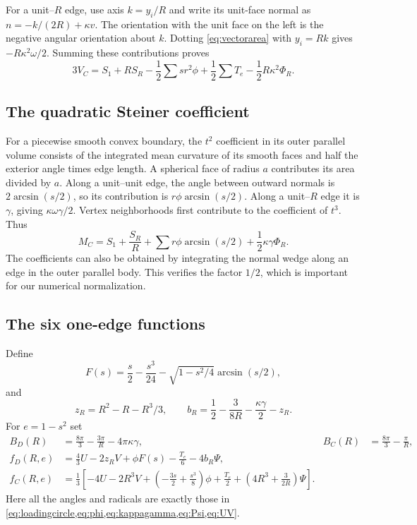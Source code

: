 \documentclass[11pt]{article}
\numberwithin{equation}{section}
\theoremstyle{definition}\newtheorem{definition}[theorem]{Definition}
\theoremstyle{remark}\newtheorem{remark}[theorem]{Remark}
\begin{document}
For a unit--$R$ edge, use axis $k=y_i/R$ and write its unit-face normal as
$n=-k/(2R)+\kappa v$. The orientation with the unit face on the left is the
negative angular orientation about $k$. Dotting \cref{eq:vectorarea} with
$y_i=Rk$ gives $-R\kappa^2\omega/2$. Summing these contributions proves
\begin{equation}\label{eq:VCledger}
 3V_C=S_1+RS_R-\frac12\sum sr^2\phi+\frac12\sum T_e
                         -\frac12R\kappa^2\Phi_R.
\end{equation}

\subsection{The quadratic Steiner coefficient}
For a piecewise smooth convex boundary, the $t^2$ coefficient in its outer
parallel volume consists of the integrated mean curvature of its smooth
faces and half the exterior angle times edge length. A spherical face of
radius $a$ contributes its area divided by $a$. Along a unit--unit edge,
the angle between outward normals is $2\arcsin(s/2)$, so its contribution
is $r\phi\arcsin(s/2)$. Along a unit--$R$ edge it is $\gamma$, giving
$\kappa\omega\gamma/2$. Vertex neighborhoods first contribute to the
coefficient of $t^3$. Thus
\begin{equation}\label{eq:MCledger}
 M_C=S_1+\frac{S_R}{R}+\sum r\phi\arcsin(s/2)
                         +\frac12\kappa\gamma\Phi_R.
\end{equation}
The coefficients can also be obtained by integrating the normal wedge along
an edge in the outer parallel body. This verifies the factor $1/2$, which is
important for our numerical normalization.

\subsection{The six one-edge functions}
Define
\begin{equation}\label{eq:smallF}
 F(s)=\frac s2-\frac{s^3}{24}-\sqrt{1-s^2/4}\arcsin(s/2),
\end{equation}
and
\[
 z_R=R^2-R-R^3/3,\qquad
 b_R=\frac12-\frac3{8R}-\frac{\kappa\gamma}{2}-z_R.
\]
For $e=1-s^2$ set
\begin{align}
 B_D(R)&=\frac{8\pi}{3}-\frac{3\pi}{R}-4\pi\kappa\gamma,
 &B_C(R)&=\frac{8\pi}{3}-\frac\pi R,\label{eq:Bterms}\\
 f_D(R,e)&=\frac43U-2z_RV+\phi F(s)-\frac{T_e}{6}-4b_R\Psi,
 &\nonumber\\
 f_C(R,e)&=\frac13\left[-4U-2R^3V+
 \left(-\frac{3s}{2}+\frac{s^3}{8}\right)\phi+\frac{T_e}{2}
 +\left(4R^3+\frac3{2R}\right)\Psi\right].\label{eq:edgeterms}
\end{align}
Here all the angles and radicals are exactly those in
\cref{eq:loadingcircle,eq:phi,eq:kappagamma,eq:Psi,eq:UV}.
\end{document}
